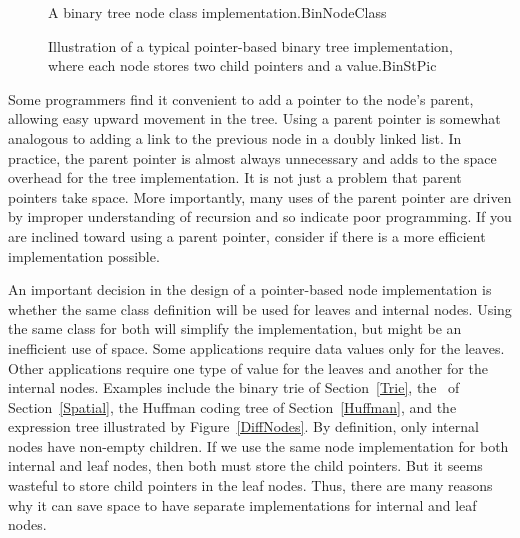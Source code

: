 \begin{figure}
\vspace{-\bigskipamount}
\vspace{-\smallskipamount}

{A binary tree node class implementation.}{BinNodeClass}
\vspace{-\smallskipamount}

\end{figure}

\begin{figure}
\vspace{-\bigskipamount}\vspace{-\medskipamount}

{Illustration of a typical pointer-based binary tree implementation,
where each node stores two child pointers and a value.}{BinStPic}
\end{figure}

Some programmers find it convenient to add a pointer to the
node's parent, allowing easy upward movement in the
tree.
Using a parent pointer is somewhat analogous to adding a link to the
previous node in a doubly linked list.
In practice, the parent pointer is almost always unnecessary
and adds to the space overhead for the tree implementation.
It is not just a problem that parent pointers take space.
More importantly, many uses of the parent pointer are driven by
improper understanding of recursion and so indicate poor programming.
If you are inclined toward using a parent pointer, consider if there
is a more efficient implementation possible.

An important decision in the design of a pointer-based node
implementation is whether the same class definition will be used for
leaves and internal nodes.
Using the same class for both will simplify the implementation, but
might be an inefficient use of space.
Some applications require data values only for the leaves.
Other applications require one type of value for the leaves and
another for the internal nodes.
Examples include the binary trie of Section~\ref{Trie},
the \PRquad\ of Section~\ref{Spatial},
the Huffman coding tree
of Section~\ref{Huffman}, and the expression
tree illustrated by Figure~\ref{DiffNodes}. 
By definition, only internal nodes have non-empty children.
If we use the same node implementation for both internal and leaf
nodes, then both must store the child pointers.
But it seems wasteful to store child pointers in the leaf nodes.
Thus, there are many reasons why it can save space to have separate
implementations for internal and leaf nodes.

